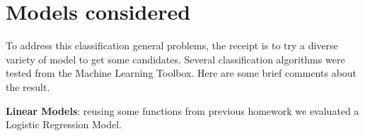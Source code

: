 \chapter{Models considered}
\label{ch:ch2models}

To address this classification general problems, the receipt is to try a diverse variety of model to get some candidates. Several classification algorithms were tested from the Machine Learning Toolbox. Here are some brief comments about the result.

\textbf{Linear Models}: reusing some functions from previous homework we evaluated a Logistic Regression Model. 
